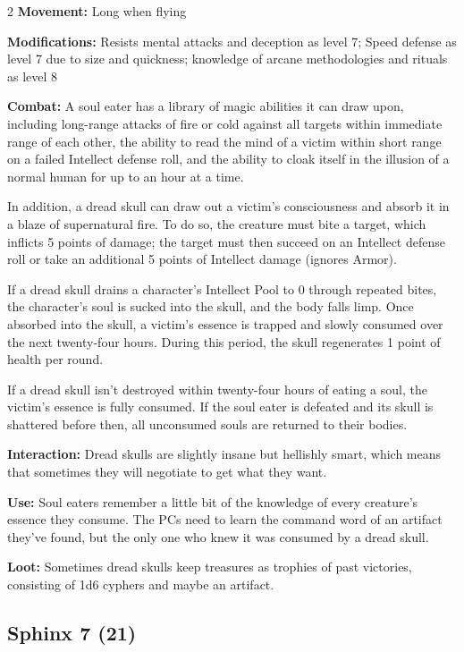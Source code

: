 \begin{multicols}{2}
\textbf{Movement:} Long when flying 

\textbf{Modifications:} Resists mental attacks and deception as level 7; Speed defense as level 7 due to size and quickness; knowledge of arcane methodologies and rituals as level 8 

\textbf{Combat:} A soul eater has a library of magic abilities it can draw upon, including long-range attacks of fire or cold against all targets within immediate range of each other, the ability to read the mind of a victim within short range on a failed Intellect defense roll, and the ability to cloak itself in the illusion of a normal human for up to an hour at a time. 

In addition, a dread skull can draw out a victim’s consciousness and absorb it in a blaze of supernatural fire. To do so, the creature must bite a target, which inflicts 5 points of damage; the target must then succeed on an Intellect defense roll or take an additional 5 points of Intellect damage (ignores Armor). 

If a dread skull drains a character’s Intellect Pool to 0 through repeated bites, the character’s soul is sucked into the skull, and the body falls limp. Once absorbed into the skull, a victim’s essence is trapped and slowly consumed over the next twenty-four hours. During this period, the skull regenerates 1 point of health per round. 

If a dread skull isn’t destroyed within twenty-four hours of eating a soul, the victim’s essence is fully consumed. If the soul eater is defeated and its skull is shattered before then, all unconsumed souls are returned to their bodies. 

\textbf{Interaction:} Dread skulls are slightly insane but hellishly smart, which means that sometimes they will negotiate to get what they want. 

\textbf{Use:} Soul eaters remember a little bit of the knowledge of every creature’s essence they consume. The PCs need to learn the command word of an artifact they’ve found, but the only one who knew it was consumed by a dread skull. 

\textbf{Loot:} Sometimes dread skulls keep treasures as trophies of past victories, consisting of 1d6 cyphers and maybe an artifact.

\subsection{Sphinx 7 (21)}


\end{multicols}
